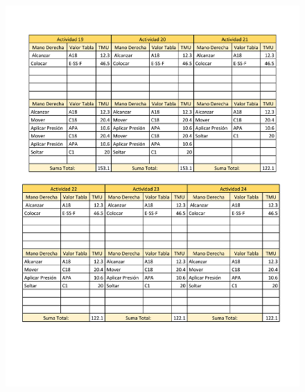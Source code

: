                 \begin{figure}[H]
        \centering
        \includegraphics[trim = {5mm 45mm 1mm 10mm},clip,scale=0.35]{19/Img/tablaTMU4.pdf}
        \newpage
        \label{fig:tablaTMU4}    
    \end{figure}
